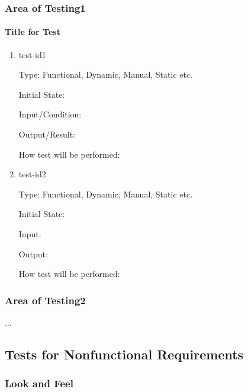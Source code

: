 \documentclass[12pt, titlepage]{article}
\begin{document}


\subsubsection{Area of Testing1}

\paragraph{Title for Test}

\begin{enumerate}

  \item{test-id1\\}

        Type: Functional, Dynamic, Manual, Static etc.

        Initial State:

        Input/Condition:

        Output/Result:

        How test will be performed:

  \item{test-id2\\}

        Type: Functional, Dynamic, Manual, Static etc.

        Initial State:

        Input:

        Output:

        How test will be performed:

\end{enumerate}

\subsubsection{Area of Testing2}

...

\subsection{Tests for Nonfunctional Requirements}

\subsubsection{Look and Feel}
\end{document}
